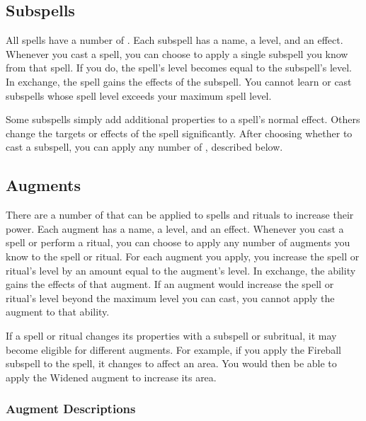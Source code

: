     \subsection{Subspells}\label{Subspells}
        All spells have a number of .
        Each subspell has a name, a level, and an effect.
        Whenever you cast a spell, you can choose to apply a single subspell you know from that spell.
        If you do, the spell's level becomes equal to the subspell's level.
        In exchange, the spell gains the effects of the subspell.
        You cannot learn or cast subspells whose spell level exceeds your maximum spell level.

        Some subspells simply add additional properties to a spell's normal effect.
        Others change the targets or effects of the spell significantly.
        After choosing whether to cast a subspell, you can apply any number of , described below.

    \subsection{Augments}\label{Augments}
        There are a number of  that can be applied to spells and rituals to increase their power.
        Each augment has a name, a level, and an effect.
        Whenever you cast a spell or perform a ritual, you can choose to apply any number of augments you know to the spell or ritual.
        For each augment you apply, you increase the spell or ritual's level by an amount equal to the augment's level.
        In exchange, the ability gains the effects of that augment.
        If an augment would increase the spell or ritual's level beyond the maximum level you can cast, you cannot apply the augment to that ability.

        If a spell or ritual changes its properties with a subspell or subritual, it may become eligible for different augments.
        For example, if you apply the Fireball subspell to the  spell, it changes to affect an area.
        You would then be able to apply the Widened augment to increase its area.

        \subsubsection{Augment Descriptions}\label{Augment Descriptions}


